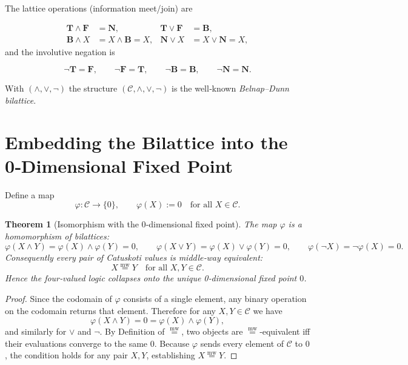 \documentclass[12pt,a4paper]{article}
\newcommand{\dfix}{\mathfrak{0}}          %
\newcommand{\mw}{\mathrel{\overset{\mathrm{mw}}{=}}} %
\newcommand{\phiMap}{\varphi}            %
\newtheorem{theorem}{Theorem}[section]
\begin{document}
The lattice operations (information meet/join) are

$$
\begin{aligned}
\mathbf{T}\wedge\mathbf{F}&=\mathbf{N}, &
\mathbf{T}\vee\mathbf{F}&=\mathbf{B},\\
\mathbf{B}\wedge X&=X\wedge\mathbf{B}=X, &
\mathbf{N}\vee X&=X\vee\mathbf{N}=X,
\end{aligned}
$$
and the involutive negation is

$$
\neg\mathbf{T}=\mathbf{F},\qquad
\neg\mathbf{F}=\mathbf{T},\qquad
\neg\mathbf{B}=\mathbf{B},\qquad
\neg\mathbf{N}=\mathbf{N}.
$$

With $(\wedge,\vee,\neg)$ the structure
$(\mathcal{C},\wedge,\vee,\neg)$ is the well‑known
\emph{Belnap–Dunn bilattice}.

\section{Embedding the Bilattice into the 0‑Dimensional Fixed Point}

Define a map
\begin{equation}
\phiMap:\mathcal{C}\longrightarrow\{\dfix\},
\qquad
\phiMap(X):=\dfix\quad\text{for all }X\in\mathcal{C}.
\tag{1}
\end{equation}

\begin{theorem}[Isomorphism with the 0‑dimensional fixed point]
The map $\phiMap$ is a homomorphism of bilattices:
$$
\phiMap(X\wedge Y)=\phiMap(X)\wedge\phiMap(Y)=\dfix,
\qquad
\phiMap(X\vee Y)=\phiMap(X)\vee\phiMap(Y)=\dfix,
\qquad
\phiMap(\neg X)=\neg\phiMap(X)=\dfix .
$$
Consequently every pair of Catuskoti values is middle‑way equivalent:
$$
X\mw Y\quad\text{for all }X,Y\in\mathcal{C}.
$$
Hence the four‑valued logic collapses onto the unique
0‑dimensional fixed point $\dfix$.
\end{theorem}
\begin{proof}
Since the codomain of $\phiMap$ consists of a single element,
any binary operation on the codomain returns that element.
Therefore for any $X,Y\in\mathcal{C}$ we have
$$
\phiMap(X\wedge Y)=\dfix=\phiMap(X)\wedge\phiMap(Y),
$$
and similarly for $\vee$ and $\neg$.
By Definition of $\mw$, two objects are $\mw$‑equivalent
iff their evaluations converge to the same $\dfix$.
Because $\phiMap$ sends every element of $\mathcal{C}$ to $\dfix$,
the condition holds for any pair $X,Y$, establishing $X\mw Y$.
\end{proof}
\end{document}
